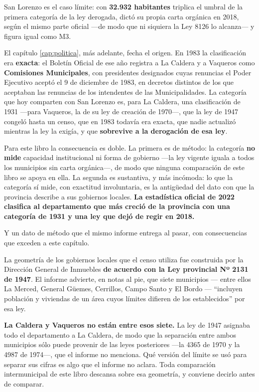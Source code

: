 \begin{cautela}
San Lorenzo es el caso límite: con \textbf{32.932 habitantes} triplica el umbral de la primera categoría de la ley derogada, dictó su propia carta orgánica en 2018, según el mismo parte oficial ---de modo que ni siquiera la Ley 8126 lo alcanza--- y figura igual como M3.

El capítulo \ref{cap:politica}, más adelante, fecha el origen. En 1983 la clasificación era \textbf{exacta}: el Boletín Oficial de ese año registra a La Caldera y a Vaqueros como \textbf{Comisiones Municipales}, con presidentes designados cuyas renuncias el Poder Ejecutivo aceptó el 9 de diciembre de 1983, en decretos distintos de los que aceptaban las renuncias de los intendentes de las Municipalidades. La categoría que hoy comparten con San Lorenzo es, para La Caldera, una clasificación de 1931 ---para Vaqueros, la de su ley de creación de 1970---, que la ley de 1947 congeló hasta un censo, que en 1983 todavía era exacta, que nadie actualizó mientras la ley la exigía, y que \textbf{sobrevive a la derogación de esa ley}.

Para este libro la consecuencia es doble. La primera es de método: la categoría \textbf{no mide} capacidad institucional ni forma de gobierno ---la ley vigente iguala a todos los municipios sin carta orgánica---, de modo que ninguna comparación de este libro se apoya en ella. La segunda es sustantiva, y más incómoda: lo que la categoría sí mide, con exactitud involuntaria, es la antigüedad del dato con que la provincia describe a sus gobiernos locales. \textbf{La estadística oficial de 2022 clasifica al departamento que más creció de la provincia con una categoría de 1931 y una ley que dejó de regir en 2018.}
\end{cautela}

Y un dato de método que el mismo informe entrega al pasar, con consecuencias que exceden a este capítulo.

La geometría de los gobiernos locales que el censo utiliza fue construida por la Dirección General de Inmuebles \textbf{de acuerdo con la Ley provincial Nº 2131 de 1947}. El informe advierte, en notas al pie, que siete municipios --- entre ellos La Merced, General Güemes, Cerrillos, Campo Santo y El Bordo --- ``incluyen población y viviendas de un área cuyos límites difieren de los establecidos'' por esa ley.

\textbf{La Caldera y Vaqueros no están entre esos siete.} La ley de 1947 asignaba todo el departamento a La Caldera, de modo que la separación entre ambos municipios sólo puede provenir de las leyes posteriores ---la 4365 de 1970 y la 4987 de 1974---, que el informe no menciona. Qué versión del límite se usó para separar sus cifras es algo que el informe no aclara. Toda comparación intermunicipal de este libro descansa sobre esa geometría, y conviene decirlo antes de comparar.


